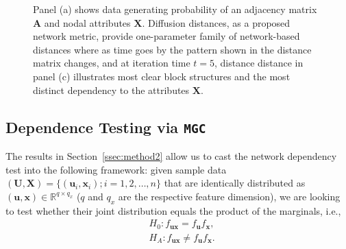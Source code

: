 \documentclass[11pt]{article}
\theoremstyle{definition}
\begin{document}
\begin{figure}[ht]
\begin{subfigure}[b]{0.23\textwidth}
		\caption{}
		\label{fig:d}
	\end{subfigure}
	\caption{Panel (a) shows data generating probability of an adjacency matrix $\mathbf{A}$ and nodal attributes $\mathbf{X}$. Diffusion distances, as a proposed network metric, provide one-parameter family of network-based distances where as time goes by the pattern shown in the distance matrix changes, and at iteration time $t = 5$, distance distance in panel (c) illustrates most clear block structures and the most distinct dependency to the attributes $\mathbf{X}$.}
	\label{fig:diffusions}
\end{figure}

\vspace*{-0.4cm}
\subsection{Dependence Testing via \texttt{MGC}}
\label{ssec:method1}
The results in Section~\ref{ssec:method2} allow us to cast the network dependency test into the following framework: given sample data $(\mathbf{U}, \mathbf{X}) = \{  (\mathbf{u}_{i}, \mathbf{x}_{i} ) ; i = 1,2, \ldots, n \}$ that are identically distributed as $(\mathbf{u},\mathbf{x}) \in \mathbb{R}^{q \times q_x}$ ($q$ and $q_x$ are the respective feature dimension), we are looking to test whether their joint distribution equals the product of the marginals, i.e.,
\begin{align*}
& H_{0}: f_{\mathbf{u}\mathbf{x}}=f_{\mathbf{u}}f_{\mathbf{x}},\\
& H_{A}: f_{\mathbf{u}\mathbf{x}}\neq f_{\mathbf{u}}f_{\mathbf{x}}.
\end{align*}
\end{document}
